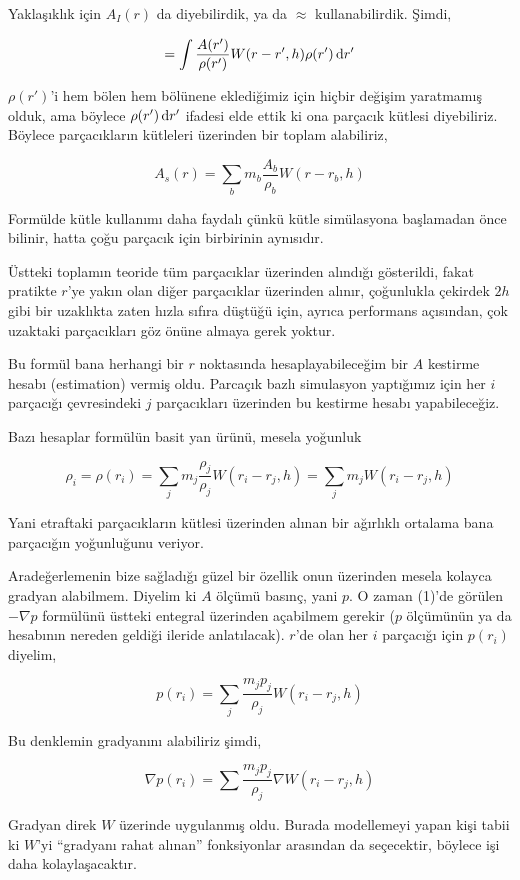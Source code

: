 \documentclass[12pt,fleqn]{article}\usepackage{../../common}
\begin{document}
Yaklaşıklık için $A_I(r)$ da diyebilirdik, ya da $\approx$
kullanabilirdik. Şimdi,

$$
 = \int \frac{A(r')}{\rho(r')} W(r-r',h) \rho(r') \,\mathrm{d} r'
$$

$\rho(r')$'i hem bölen hem bölünene eklediğimiz için hiçbir değişim yaratmamış
olduk, ama böylece $\rho(r') \,\mathrm{d} r'$ ifadesi elde ettik ki ona parçacık kütlesi
diyebiliriz. Böylece parçacıkların kütleleri üzerinden bir toplam alabiliriz,

$$
A_s(r) = \sum_b m_b \frac{A_b}{\rho_b} W(r-r_b, h)
$$

Formülde kütle kullanımı daha faydalı çünkü kütle simülasyona başlamadan önce
bilinir, hatta çoğu parçacık için birbirinin aynısıdır. 

Üstteki toplamın teoride tüm parçacıklar üzerinden alındığı gösterildi, fakat
pratikte $r$'ye yakın olan diğer parçacıklar üzerinden alınır, çoğunlukla
çekirdek $2h$ gibi bir uzaklıkta zaten hızla sıfıra düştüğü için, ayrıca
performans açısından, çok uzaktaki parçacıkları göz önüne almaya gerek yoktur.

Bu formül bana herhangi bir $r$ noktasında hesaplayabileceğim bir $A$ kestirme
hesabı (estimation) vermiş oldu. Parcaçık bazlı simulasyon yaptığımız için her
$i$ parçacığı çevresindeki $j$ parçacıkları üzerinden bu kestirme hesabı
yapabileceğiz.

Bazı hesaplar formülün basit yan ürünü, mesela yoğunluk

$$
\rho_i = \rho(r_i) = \sum_j m_j \frac{\rho_j}{\rho_j} W(r_i-r_j, h) =
\sum_j m_j  W(r_i-r_j, h)
$$

Yani etraftaki parçacıkların kütlesi üzerinden alınan bir ağırlıklı ortalama
bana parçacığın yoğunluğunu veriyor.

Aradeğerlemenin bize sağladığı güzel bir özellik onun üzerinden mesela kolayca
gradyan alabilmem. Diyelim ki $A$ ölçümü basınç, yani $p$. O zaman (1)'de
görülen $-\nabla p$ formülünü üstteki entegral üzerinden açabilmem gerekir ($p$
ölçümünün ya da hesabının nereden geldiği ileride anlatılacak). $r$'de olan her
$i$ parçacığı için $p(r_i)$ diyelim,

$$
p(r_i) = \sum_j \frac{m_j p_j}{\rho_j} W(r_i-r_j,h)
$$

Bu denklemin gradyanını alabiliriz şimdi,

$$
\nabla p(r_i) = \sum \frac{m_j p_j}{\rho_j} \nabla W(r_i-r_j,h)
$$

Gradyan direk $W$ üzerinde uygulanmış oldu. Burada modellemeyi yapan kişi tabii
ki $W$'yi ``gradyanı rahat alınan'' fonksiyonlar arasından da seçecektir,
böylece işi daha kolaylaşacaktır.
\end{document}
